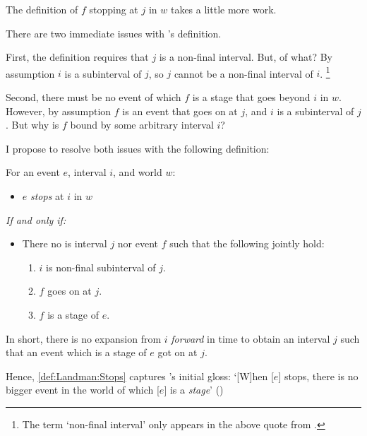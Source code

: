 \begin{note}
  The definition of \(f\) stopping at \(j\) in \(w\) takes a little more work.

  There are two immediate issues with \citeauthor{Landman:1992wh}'s definition.

  First, the definition requires that \(j\) is a non-final interval.
  But, of what?
  By assumption \(i\) is a subinterval of \(j\), so \(j\) cannot be a non-final interval of \(i\).%
  \footnote{
    The term `non-final interval' only appears in the above quote from \citeauthor{Landman:1992wh}.
  }

  Second, there must be no event of which \(f\) is a stage that goes beyond \(i\) in \(w\).
  However, by assumption \(f\) is an event that goes on at \(j\), and \(i\) is a subinterval of \(j\).
  But why is \(f\) bound by some arbitrary interval \(i\)?

  I propose to resolve both issues with the following definition:
  \begin{definition}[Stops]
    \label{def:Landman:Stops}
    For an event \(e\), interval \(i\), and world \(w\):
    \begin{itemize}
    \item
      \(e\) \emph{stops} at \(i\) in \(w\)
    \end{itemize}
    \emph{If and only if:}
    \begin{itemize}
    \item
      There no is interval \(j\) nor event \(f\) such that the following jointly hold:
      \begin{enumerate}[label=\alph*., noitemsep]
      \item
        \(i\) is non-final subinterval of \(j\).
      \item
        \(f\) goes on at \(j\).
      \item
        \(f\) is a stage of \(e\).
      \end{enumerate}
    \end{itemize}
    \vspace{-\baselineskip}
  \end{definition}
  In short, there is no expansion from \(i\) \emph{forward} in time to obtain an interval \(j\) such that an event which is a stage of \(e\) got on at \(j\).

  Hence, \autoref{def:Landman:Stops} captures \citeauthor{Landman:1992wh}'s initial gloss: `[W]hen [\(e\)] stops, there is no bigger event in the world of which [\(e\)] is a \emph{stage}' (\citeyear[23]{Landman:1992wh})
\end{note}

